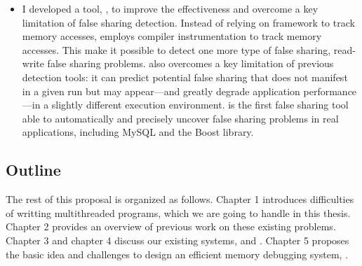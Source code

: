 \begin{itemize}
\item I developed a tool, \predator{}, to improve the effectiveness and overcome a key  limitation of false sharing detection. Instead of relying on \sheriff{} framework to track memory accesses, \predator{} employs compiler instrumentation to track memory accesses. This make it possible to detect one more type of false sharing, read-write false sharing problems. \Predator{} also overcomes a key limitation of previous detection tools: it can predict potential false sharing that does not manifest in a given run but may appear—and greatly degrade application performance—in a slightly different execution
environment. \Predator is the first false sharing tool able to automatically and precisely uncover false sharing problems in real applications, including MySQL and the Boost library.


\end{itemize}

\subsection*{Outline}
The rest of this proposal is organized as follows. Chapter 1 introduces 
difficulties of writting multithreaded programs, which we are going to handle in this thesis. 
Chapter 2 provides an overview of previous work on these existing problems. 
Chapter 3 and chapter 4 discuss our existing systems, \sheriff{} and \dthreads{}.
Chapter 5 proposes the basic idea and challenges to design an efficient memory debugging system, \DoubleTake{}. 


